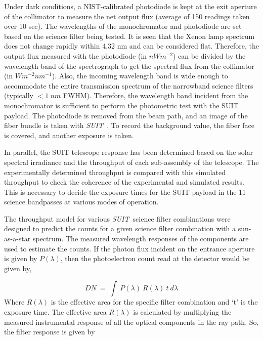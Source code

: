 \documentclass[12pt]{spieman}  %
\newcommand{\suit}{{\it SUIT~}}
\begin{document}
Under dark conditions, a NIST-calibrated photodiode is kept at the exit aperture of the collimator to measure the net output flux (average of 150 readings taken over 10 sec). The wavelengths of the monochromator and photodiode are set based on the science filter being tested. It is seen that the Xenon lamp spectrum does not change rapidly within 4.32 nm and can be considered flat. Therefore, the output flux measured with the photodiode (in $nWm^{-2}$) can be divided by the wavelength band of the spectrograph to get the spectral flux from the collimator (in $W m^{-2} nm^{-1}$). Also, the incoming wavelength band is wide enough to accommodate the entire transmission spectrum of the narrowband science filters (typically $< 1~nm$ FWHM). Therefore, the wavelength band incident from the monochromator is sufficient to perform the photometric test with the SUIT payload. The photodiode is removed from the beam path, and an image of the fiber bundle is taken with \suit. To record the background value, the fiber face is covered, and another exposure is taken.
		
In parallel, the SUIT telescope response has been determined based on the solar spectral irradiance and the throughput of each sub-assembly of the telescope. The experimentally determined throughput is compared with this simulated throughput to check the coherence of the experimental and simulated results. This is necessary to decide the exposure times for the SUIT payload in the 11 science bandpasses at various modes of operation.

 The throughput model for various \suit science filter combinations were designed to predict the counts for a given science filter combination with a sun-as-a-star spectrum. The measured wavelength responses of the components are used to estimate the counts. If the photon flux incident on the entrance aperture is given by $P(\lambda)$, then the photoelectron count read at the detector would be given by,

 \begin{equation}\label{eq1}
     DN~=~\int~P(\lambda)~R(\lambda)~t~d\lambda
 \end{equation}
Where $R(\lambda)$ is the effective area for the specific filter combination and ‘t’ is the exposure time. The effective area $R(\lambda)$ is calculated by multiplying the measured instrumental response of all the optical components in the ray path. So, the filter response is given by
\end{document}
